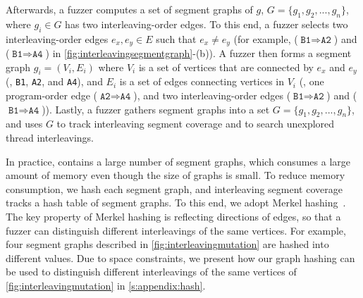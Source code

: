 Afterwards, a fuzzer computes a set of segment graphs of $g$,
$G = \{g_1, g_2, ..., g_n\}$, where $g_i \in G$ has two
interleaving-order edges.
%
To this end, a fuzzer selects two interleaving-order edges
$e_x, e_y \in E$ such that $e_x \neq e_y$ (for example,
($\texttt{B1} \Rightarrow \texttt{A2}$) and
($\texttt{B1} \Rightarrow \texttt{A4}$) in
\autoref{fig:interleavingsegmentgraph}-(b)).
%
A fuzzer then forms a segment graph $g_i = (V_i, E_i)$ where $V_i$ is
a set of vertices that are connected by $e_x$ and $e_y$ (\ie,
\texttt{B1}, \texttt{A2}, and \texttt{A4}), and $E_i$ is a set of
edges connecting vertices in $V_i$ (\ie, one program-order edge
($\texttt{A2} \Rightarrow \texttt{A4}$), and two interleaving-order
edges ($\texttt{B1} \Rightarrow \texttt{A2}$) and
($\texttt{B1} \Rightarrow \texttt{A4}$)).
%
Lastly, a fuzzer gathers segment graphs into a set
$G = \{g_1, g_2, ..., g_n\}$, and uses $G$ to track interleaving
segment coverage and to search unexplored thread interleavings.





%
In practice, \intcov contains a large number of segment graphs,
which consumes a large amount of memory even though the size of graphs
is small.
%
To reduce memory consumption, we hash each segment graph, and
interleaving segment coverage tracks a hash table of segment graphs.
%
To this end, we adopt Merkel hashing~\cite{treehashing, treehashing2}.
%
The key property of Merkel hashing is reflecting directions of edges,
so that a fuzzer can distinguish different interleavings of the same
vertices. For example, four segment graphs described in
\autoref{fig:interleavingmutation} are hashed into different values.
%
Due to space constraints, we present how our graph hashing can be used
to distinguish different interleavings of the same vertices of
\autoref{fig:interleavingmutation} in \autoref{s:appendix:hash}.








%
%
%

